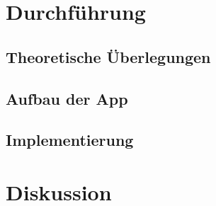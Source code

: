 \documentclass[12pt, a4paper]{article}
\begin{document}
\section{Durchführung}

\subsection{Theoretische Überlegungen}


\subsection{Aufbau der App}


\subsection{Implementierung}


\section{Diskussion}


\end{document}
